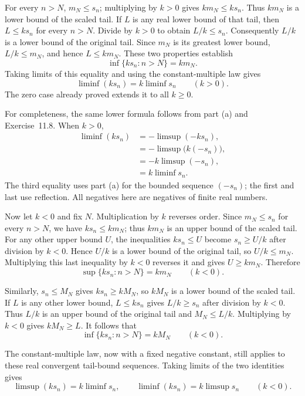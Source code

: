 For every $n>N$, $m_N\le s_n$; multiplying by $k>0$ gives
$km_N\le ks_n$. Thus $km_N$ is a lower bound of the scaled tail.
If $L$ is any real lower bound of that tail, then $L\le ks_n$
for every $n>N$. Divide by $k>0$ to obtain $L/k\le s_n$.
Consequently $L/k$ is a lower bound of the original tail. Since
$m_N$ is its greatest lower bound, $L/k\le m_N$, and hence
$L\le km_N$. These two properties establish
\[
 \inf\{ks_n:n>N\}=km_N.
\]
Taking limits of this equality and using the constant-multiple law
gives
\[
 \boxed{\liminf(ks_n)=k\liminf s_n}\qquad(k>0).
\]
The zero case already proved extends it to all $k\ge0$.

For completeness, the same lower formula follows from part (a)
and Exercise~11.8. When $k>0$,
\begin{align*}
 \liminf(ks_n)
   &=-\limsup(-ks_n),\\
   &=-\limsup\bigl(k(-s_n)\bigr),\\
   &=-k\limsup(-s_n),\\
   &=k\liminf s_n.
\end{align*}
The third equality uses part (a) for the bounded sequence $(-s_n)$;
the first and last use reflection. All negatives here are negatives
of finite real numbers.

Now let $k<0$ and fix $N$. Multiplication by $k$ reverses order.
Since $m_N\le s_n$ for every $n>N$, we have $ks_n\le km_N$;
thus $km_N$ is an upper bound of the scaled tail.
For any other upper bound $U$, the inequalities $ks_n\le U$
become $s_n\ge U/k$ after division by $k<0$.
Hence $U/k$ is a lower bound of the original tail, so
$U/k\le m_N$. Multiplying this last inequality by $k<0$ reverses
it and gives $U\ge km_N$. Therefore
\[
 \sup\{ks_n:n>N\}=km_N\qquad(k<0).
\]

Similarly, $s_n\le M_N$ gives $ks_n\ge kM_N$, so $kM_N$ is a
lower bound of the scaled tail. If $L$ is any other lower bound,
$L\le ks_n$ gives $L/k\ge s_n$ after division by $k<0$.
Thus $L/k$ is an upper bound of the original tail and
$M_N\le L/k$. Multiplying by $k<0$ gives $kM_N\ge L$.
It follows that
\[
 \inf\{ks_n:n>N\}=kM_N\qquad(k<0).
\]

The constant-multiple law, now with a fixed negative constant, still
applies to these real convergent tail-bound sequences. Taking limits
of the two identities gives
\[
 \boxed{\limsup(ks_n)=k\liminf s_n,
 \qquad\liminf(ks_n)=k\limsup s_n}\qquad(k<0).
\]

